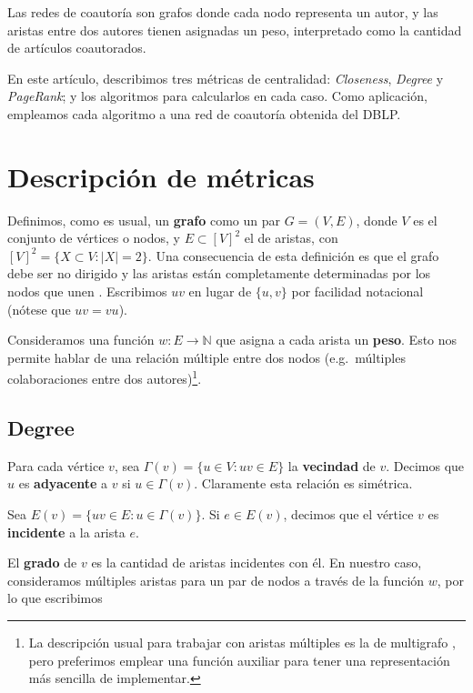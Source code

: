 \documentclass[journal]{IEEEtran}
\begin{document}
Las redes de coautoría son grafos donde cada nodo representa un autor, y las aristas entre dos autores tienen asignadas un peso, interpretado como la cantidad de artículos coautorados.

En este artículo, describimos tres métricas de centralidad: \textit{Closeness}, \textit{Degree} y \textit{PageRank}; y los algoritmos para calcularlos en cada caso. Como aplicación, empleamos cada algoritmo a una red de coautoría obtenida del DBLP.

\section{Descripción de métricas}

Definimos, como es usual, un \textbf{grafo} como un par \(G = (V, E)\), donde \(V\) es el conjunto de vértices o nodos, y \(E \subset [V]^2 \) el de aristas, con \([V]^2 = \{ X \subset V : |X| = 2 \}\). Una consecuencia de esta definición es que el grafo debe ser no dirigido y las aristas están completamente determinadas por los nodos que unen \cite{diestel}. Escribimos \(uv\) en lugar de \(\{u, v\}\) por facilidad notacional (nótese que \(uv = vu\)).

Consideramos una función \(w: E \rightarrow \mathbb{N} \) que asigna a cada arista un \textbf{peso}. Esto nos permite hablar de una relación múltiple entre dos nodos (e.g.\ múltiples colaboraciones entre dos autores)\footnote{La descripción usual para trabajar con aristas múltiples es la de multigrafo \cite{diestel}, pero preferimos emplear una función auxiliar para tener una representación más sencilla de implementar. }. 

\subsection{Degree}

Para cada vértice \(v\), sea \(\Gamma(v) = \{u \in V : uv \in E \}\) la \textbf{vecindad} de \(v\). Decimos que \(u\) es \textbf{adyacente} a \(v\) si \(u \in \Gamma(v)\). Claramente esta relación es simétrica.

Sea \(E(v) = \{uv \in E : u \in \Gamma(v) \}\). Si \(e \in E(v)\), decimos que el vértice \(v\) es \textbf{incidente} a la arista \(e\).

El \textbf{grado} de \(v\) es la cantidad de aristas incidentes con él. En nuestro caso, consideramos múltiples aristas para un par de nodos a través de la función \(w\), por lo que escribimos \cite{bollobas}
\end{document}

